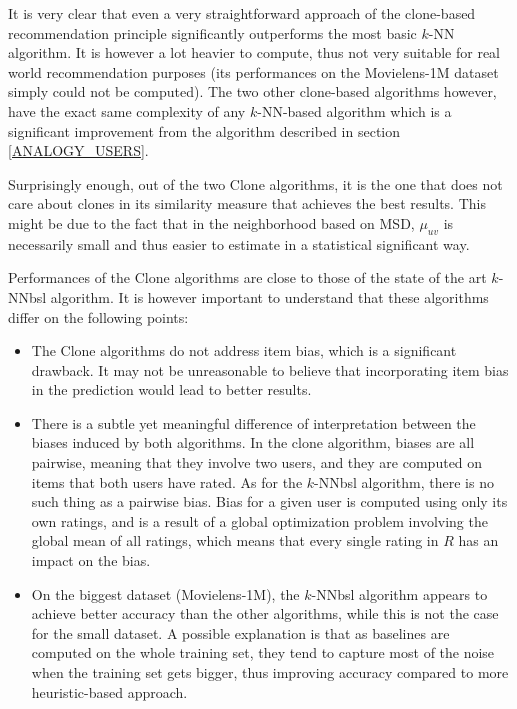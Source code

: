 \documentclass[conference]{IEEEtran}
\begin{document}
It is very clear that even a very straightforward approach of the clone-based
recommendation principle significantly outperforms the most basic $k$-NN
algorithm. It is however a lot heavier to compute, thus not very suitable for
real world recommendation purposes (its performances on the Movielens-1M
dataset simply could not be computed). The two other clone-based algorithms
however, have the exact same complexity of any $k$-NN-based algorithm which is
a significant improvement from the algorithm described in section
\ref{ANALOGY_USERS}.


Surprisingly enough, out of the two Clone algorithms, it is the one that does
not care about clones in its similarity measure that achieves the best results.
This might be due to the fact that in the neighborhood based on MSD, $\mu_{uv}$
is necessarily small and thus easier to estimate in a statistical significant
way.

Performances of the Clone algorithms are close to those of the state of the
art $k$-NNbsl algorithm. It is however important to understand that these
algorithms differ on the following points:
\begin{itemize}
\item The Clone algorithms do not address item bias, which is a significant
  drawback. It may not be unreasonable to believe that incorporating item bias
  in the prediction would lead to better results.
\item There is a subtle yet meaningful difference of interpretation between the
  biases induced by both algorithms. In the clone algorithm, biases are all
  pairwise, meaning that they involve two users, and they are computed on items
  that both users have rated. As for the $k$-NNbsl algorithm, there is no such
  thing as a pairwise bias. Bias for a given user is computed using only its
  own ratings, and is a result of a global optimization problem involving the
  global mean of all ratings, which means that every single rating in $R$ has
  an impact on the bias.
\item On the biggest dataset (Movielens-1M), the $k$-NNbsl algorithm appears to
  achieve better accuracy than the other algorithms, while this is not the case
  for the small dataset. A possible explanation is that as baselines are
  computed on the whole training set, they tend to capture most of the noise
  when the training set gets bigger, thus improving accuracy compared to more
  heuristic-based approach.
\end{itemize}
\end{document}
